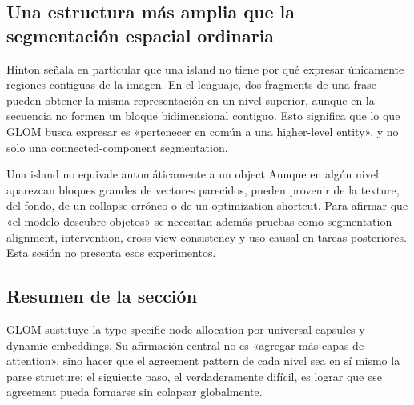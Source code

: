 \subsection{Una estructura más amplia que la segmentación espacial ordinaria}

Hinton señala en particular que una island no tiene por qué expresar únicamente regiones contiguas de la imagen. En el lenguaje, dos fragments de una frase pueden obtener la misma representación en un nivel superior, aunque en la secuencia no formen un bloque bidimensional contiguo. Esto significa que lo que GLOM busca expresar es «pertenecer en común a una higher-level entity», y no solo una connected-component segmentation.


\begin{warningbox}{Una island no equivale automáticamente a un object}
Aunque en algún nivel aparezcan bloques grandes de vectores parecidos, pueden provenir de la texture, del fondo, de un collapse erróneo o de un optimization shortcut. Para afirmar que «el modelo descubre objetos» se necesitan además pruebas como segmentation alignment, intervention, cross-view consistency y uso causal en tareas posteriores. Esta sesión no presenta esos experimentos.
\end{warningbox}

\subsection{Resumen de la sección}

GLOM sustituye la type-specific node allocation por universal capsules y dynamic embeddings. Su afirmación central no es «agregar más capas de attention», sino hacer que el agreement pattern de cada nivel sea en sí mismo la parse structure; el siguiente paso, el verdaderamente difícil, es lograr que ese agreement pueda formarse sin colapsar globalmente.
